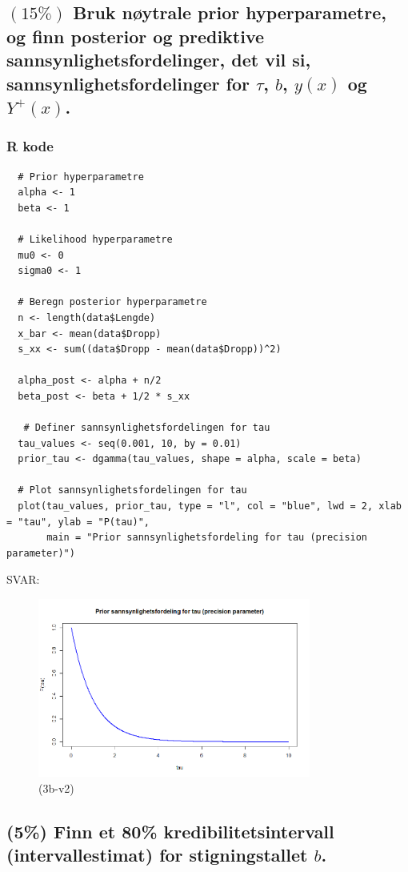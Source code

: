 \documentclass[12pt]{article}
\begin{document}
\subsection{ $(15\%)$ Bruk nøytrale prior hyperparametre, og finn posterior og prediktive sannsynlighetsfordelinger, det vil si, sannsynlighetsfordelinger for $\tau$, $b$, $y(x)$ og $Y^+(x)$.}
\subsubsection{R kode}
\begin{verbatim}
  # Prior hyperparametre
  alpha <- 1
  beta <- 1
  
  # Likelihood hyperparametre
  mu0 <- 0
  sigma0 <- 1
  
  # Beregn posterior hyperparametre
  n <- length(data$Lengde)
  x_bar <- mean(data$Dropp)
  s_xx <- sum((data$Dropp - mean(data$Dropp))^2)
  
  alpha_post <- alpha + n/2
  beta_post <- beta + 1/2 * s_xx
  
   # Definer sannsynlighetsfordelingen for tau
  tau_values <- seq(0.001, 10, by = 0.01)
  prior_tau <- dgamma(tau_values, shape = alpha, scale = beta)
  
  # Plot sannsynlighetsfordelingen for tau
  plot(tau_values, prior_tau, type = "l", col = "blue", lwd = 2, xlab = "tau", ylab = "P(tau)",
       main = "Prior sannsynlighetsfordeling for tau (precision parameter)")
\end{verbatim}
SVAR:
\begin{figure}[H]
  \centering
  \includegraphics[width=0.8\textwidth]{3b-v2.png}
  \caption{(3b-v2)}
\end{figure}

\subsection{(5\%) Finn et 80\% kredibilitetsintervall (intervallestimat) for stigningstallet $b$.}
\end{document}
